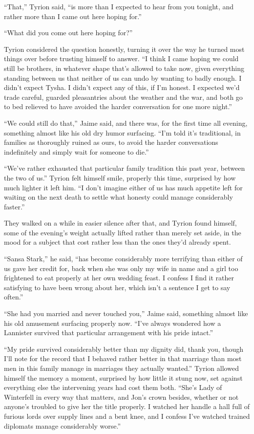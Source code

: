 “That,” Tyrion said, “is more than I expected to hear from you tonight, and rather more than I came out here hoping for.”

“What did you come out here hoping for?”

Tyrion considered the question honestly, turning it over the way he turned most things over before trusting himself to answer. “I think I came hoping we could still be brothers, in whatever shape that’s allowed to take now, given everything standing between us that neither of us can undo by wanting to badly enough. I didn’t expect Tysha. I didn’t expect any of this, if I’m honest. I expected we’d trade careful, guarded pleasantries about the weather and the war, and both go to bed relieved to have avoided the harder conversation for one more night.”

“We could still do that,” Jaime said, and there was, for the first time all evening, something almost like his old dry humor surfacing. “I’m told it’s traditional, in families as thoroughly ruined as ours, to avoid the harder conversations indefinitely and simply wait for someone to die.”

“We’ve rather exhausted that particular family tradition this past year, between the two of us.” Tyrion felt himself smile, properly this time, surprised by how much lighter it left him. “I don’t imagine either of us has much appetite left for waiting on the next death to settle what honesty could manage considerably faster.”

They walked on a while in easier silence after that, and Tyrion found himself, some of the evening’s weight actually lifted rather than merely set aside, in the mood for a subject that cost rather less than the ones they’d already spent.

“Sansa Stark,” he said, “has become considerably more terrifying than either of us gave her credit for, back when she was only my wife in name and a girl too frightened to eat properly at her own wedding feast. I confess I find it rather satisfying to have been wrong about her, which isn’t a sentence I get to say often.”

“She had you married and never touched you,” Jaime said, something almost like his old amusement surfacing properly now. “I’ve always wondered how a Lannister survived that particular arrangement with his pride intact.”

“My pride survived considerably better than my dignity did, thank you, though I’ll note for the record that I behaved rather better in that marriage than most men in this family manage in marriages they actually wanted.” Tyrion allowed himself the memory a moment, surprised by how little it stung now, set against everything else the intervening years had cost them both. “She’s Lady of Winterfell in every way that matters, and Jon’s crown besides, whether or not anyone’s troubled to give her the title properly. I watched her handle a hall full of furious lords over supply lines and a bent knee, and I confess I’ve watched trained diplomats manage considerably worse.”

